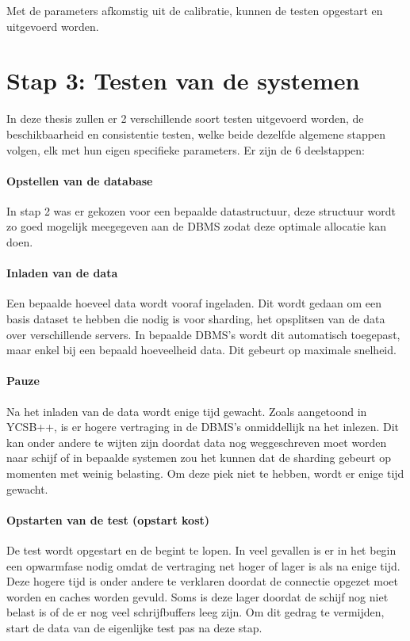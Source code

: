 Met de parameters afkomstig uit de calibratie, kunnen de testen opgestart en uitgevoerd worden. 

\section{Stap 3: Testen van de systemen}
In deze thesis zullen er 2 verschillende soort testen uitgevoerd worden, de beschikbaarheid en consistentie testen, welke beide dezelfde algemene stappen volgen, elk met hun eigen specifieke parameters. Er zijn de 6 deelstappen: 

\paragraph{Opstellen van de database} In stap 2 was er gekozen voor een bepaalde datastructuur, deze structuur wordt zo goed mogelijk meegegeven aan de DBMS zodat deze optimale allocatie kan doen.

\paragraph{Inladen van de data} Een bepaalde hoeveel data wordt vooraf ingeladen. Dit wordt gedaan om een basis dataset te hebben die nodig is voor sharding, het opsplitsen van de data over verschillende servers. In bepaalde DBMS's wordt dit automatisch toegepast, maar enkel bij een bepaald hoeveelheid data. Dit gebeurt op maximale snelheid. 

\paragraph{Pauze} Na het inladen van de data wordt enige tijd gewacht. Zoals aangetoond in YCSB++\cite[Figuur 9]{patil2011ycsb++}, is er hogere vertraging in de DBMS's onmiddellijk na het inlezen. Dit kan onder andere te wijten zijn doordat data nog weggeschreven moet worden naar schijf of in bepaalde systemen zou het kunnen dat de sharding gebeurt op momenten met weinig belasting. Om deze piek niet te hebben, wordt er enige tijd gewacht. 

\paragraph{Opstarten van de test (opstart kost)} De test wordt opgestart en de begint te lopen. In veel gevallen is er in het begin een opwarmfase nodig omdat de vertraging net hoger of lager is als na enige tijd. Deze hogere tijd is onder andere te verklaren doordat de connectie opgezet moet worden en caches worden gevuld. Soms is deze lager doordat de schijf nog niet belast is of de er nog veel schrijfbuffers leeg zijn. Om dit gedrag te vermijden, start de data van de eigenlijke test pas na deze stap. 

